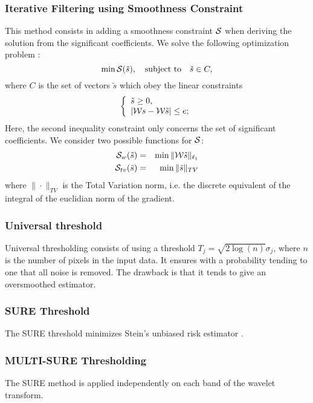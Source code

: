 \begin{itemize}
\subsubsection*{Iterative Filtering using Smoothness Constraint}
This method consists in adding a smoothness constraint ${\cal S}$ when 
deriving the solution from the significant coefficients.
We solve the following optimization problem \cite{starck:spie01a}:
\begin{equation}
  \label{eq:l1-smooth}
  \min {\cal S}(\tilde{s}), \quad \mbox{subject to} \quad \tilde{s} \in C,  
\end{equation}
where $C$ is the set of vectors $\tilde{s}$ 
which obey the linear constraints
\begin{equation}
\label{eq:constraints1}
\left\{  \begin{array}{ll}
  \tilde{s} \ge 0, \\
  |{\cal W}s - {\cal W} \tilde{s}| \le e; 
  \end{array}
  \right. 
\end{equation}
Here, the second inequality constraint 
only concerns the set of significant coefficients.
We consider two possible functions for ${\cal S}$:  
\begin{eqnarray}
   {\cal S}_w (\tilde{s})& = &   \min \|{\cal W}\tilde{s}\|_{\ell_1} \nonumber \\
   {\cal S}_{tv}(\tilde{s}) & = &   \min \|\tilde{s}\|_{TV}   
\end{eqnarray}
where $\|\cdot\|_{TV}$ is the Total Variation norm, i.e. the discrete
equivalent of the integral of the euclidian norm of the gradient.

\subsubsection*{Universal threshold}
Universal thresholding consists of using 
a threshold  \cite{rest:donoho93_1,rest:donoho93_2}
$T_j =  \sqrt{2\log(n)}\sigma_j$,
where $n$ is the number of pixels in the input data.
It ensures with a probability tending to one that all noise is removed.
The drawback is that it tends to give an oversmoothed estimator.

\subsubsection*{SURE Threshold}
The SURE threshold minimizes 
Stein's unbiased risk estimator \cite{wave:donoho95}.

\subsubsection*{MULTI-SURE Thresholding}
The SURE method is applied independently on each band of the wavelet transform.


\end{itemize}
